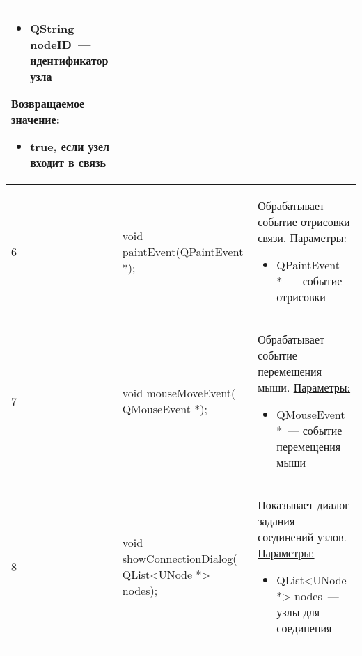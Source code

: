 \begin{longtable}[h]{|p{}|p{}|p{}|}
\begin{itemize}[nolistsep,label=,leftmargin=0cm]
      \item QString nodeID~--- идентификатор узла
    \end{itemize}
    \uline{Возвращаемое значение:}
    \begin{itemize}[nolistsep,label=,leftmargin=0cm]
      \item true, если узел входит в связь
    \end{itemize}\\ \hline
  6 & void paintEvent(QPaintEvent *); & Обрабатывает событие отрисовки связи.\newline
    \uline{Параметры:}
    \begin{itemize}[nolistsep,label=,leftmargin=0cm]
      \item QPaintEvent *~--- событие отрисовки
    \end{itemize}\\ \hline
  7 & void mouseMoveEvent( QMouseEvent *); & Обрабатывает событие перемещения мыши.\newline
    \uline{Параметры:}
    \begin{itemize}[nolistsep,label=,leftmargin=0cm]
      \item QMouseEvent *~--- событие перемещения мыши
    \end{itemize}\\ \hline
  8 & void showConnectionDialog( QList<UNode *> nodes); & Показывает диалог задания соединений узлов.\newline
    \uline{Параметры:}
    \begin{itemize}[nolistsep,label=,leftmargin=0cm]
      \item QList<UNode *> nodes~--- узлы для соединения
    \end{itemize}\\ \hline
\end{longtable}
\normalsize